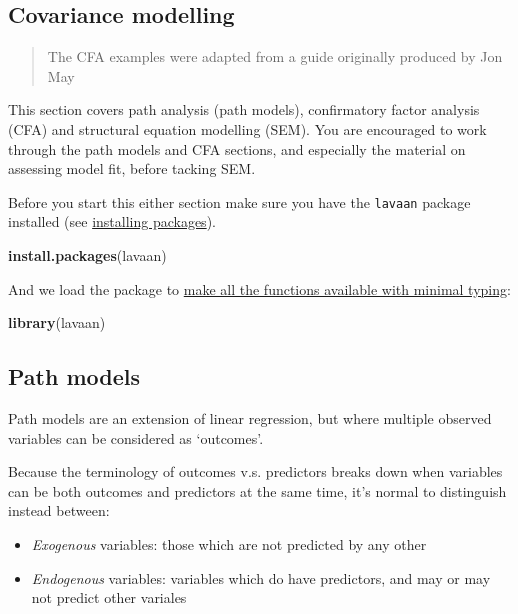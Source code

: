 \documentclass[]{article}
\newenvironment{Shaded}{\begin{snugshade}}{\end{snugshade}}
\newcommand{\KeywordTok}[1]{\textcolor[rgb]{0.13,0.29,0.53}{\textbf{#1}}}
\newcommand{\NormalTok}[1]{#1}
\theoremstyle{definition}
\theoremstyle{definition}
\theoremstyle{definition}
\theoremstyle{remark}
\begin{document}
\subsection*{Covariance modelling}\label{covariance-modelling}

\begin{quote}
The CFA examples were adapted from a guide originally produced by Jon
May
\end{quote}

This section covers path analysis (path models), confirmatory factor
analysis (CFA) and structural equation modelling (SEM). You are
encouraged to work through the path models and CFA sections, and
especially the material on assessing model fit, before tacking SEM.

Before you start this either section make sure you have the
\texttt{lavaan} package installed (see
\protect\hyperlink{packages}{installing packages}).

\begin{Shaded}
\begin{Highlighting}[]
\KeywordTok{install.packages}\NormalTok{(lavaan)}
\end{Highlighting}
\end{Shaded}

And we load the package to \protect\hyperlink{package-namespacing}{make
all the functions available with minimal typing}:

\begin{Shaded}
\begin{Highlighting}[]
\KeywordTok{library}\NormalTok{(lavaan)}
\end{Highlighting}
\end{Shaded}

\subsection*{Path models}\label{path-models}

Path models are an extension of linear regression, but where multiple
observed variables can be considered as `outcomes'.

Because the terminology of outcomes v.s. predictors breaks down when
variables can be both outcomes and predictors at the same time, it's
normal to distinguish instead between:

\begin{itemize}
\item
  \emph{Exogenous} variables: those which are not predicted by any other
\item
  \emph{Endogenous} variables: variables which do have predictors, and
  may or may not predict other variales
\end{itemize}
\end{document}

